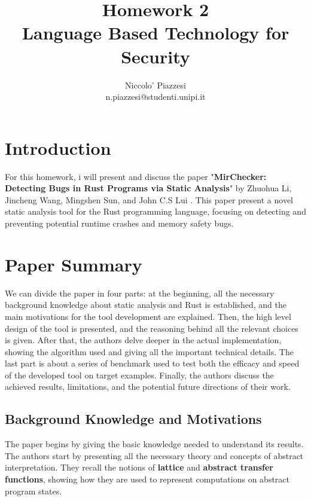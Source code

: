 \documentclass{article}
\title{Homework 2 \\ Language Based Technology for Security}
\author{Niccolo' Piazzesi \\ n.piazzesi@studenti.unipi.it}
\begin{document}
\maketitle
\frenchspacing

\section*{Introduction}
For this homework, i will present and discuss the paper "\textbf{MirChecker: Detecting Bugs in Rust Programs via Static Analysis}" by 
Zhuohua Li, Jincheng Wang, Mingshen Sun, and John C.S Lui \cite{li2021mirchecker}. This paper present a novel static analysis tool for the Rust programming language, 
focusing on detecting and preventing potential runtime crashes and memory safety bugs.
\section*{Paper Summary}
We can divide the paper in four parts: at the beginning, all the necessary background knowledge about static analysis and Rust 
is established, and the main motivations for the tool development are explained. Then, the high level design of the tool is presented, and the reasoning behind all the relevant choices is 
given. After that, the authors delve deeper in the actual implementation, showing the algorithm used and giving all the important technical details. The last part is about a series of benchmark used to 
test both the efficacy and speed of the developed tool on target examples. Finally, the authors discuss the achieved results, limitations, and the potential future directions of their work.
\subsection*{Background Knowledge and Motivations}
The paper begins by giving the basic knowledge needed to understand its results. The authors start by presenting all the necessary  theory and concepts of abstract interpretation. 
They recall the notions of \textbf{lattice} and \textbf{abstract transfer functions}, showing how they are  used to represent computations on abstract program states. 
\end{document}
